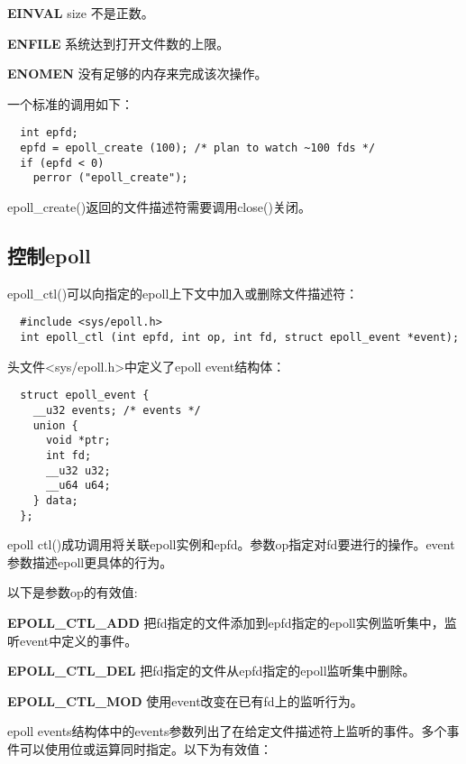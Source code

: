 \begin{eqlist*}
\item[\textbf{EINVAL}] size 不是正数。
\item[\textbf{ENFILE}] 系统达到打开文件数的上限。
\item[\textbf{ENOMEN}] 没有足够的内存来完成该次操作。
\end{eqlist*}

一个标准的调用如下：

\begin{lstlisting}
  int epfd;
  epfd = epoll_create (100); /* plan to watch ~100 fds */
  if (epfd < 0)
    perror ("epoll_create");
\end{lstlisting}

epoll\_create()返回的文件描述符需要调用close()关闭。

\subsection{控制epoll}

epoll\_ctl()可以向指定的epoll上下文中加入或删除文件描述符：

\begin{lstlisting}
  #include <sys/epoll.h>
  int epoll_ctl (int epfd, int op, int fd, struct epoll_event *event);
\end{lstlisting}

头文件<sys/epoll.h>中定义了epoll event结构体：

\begin{lstlisting}
  struct epoll_event {
    __u32 events; /* events */
    union {
      void *ptr;
      int fd;
      __u32 u32;
      __u64 u64;
    } data;
  };
\end{lstlisting}

epoll ctl()成功调用将关联epoll实例和epfd。参数op指定对fd要进行的操作。event参数描述epoll更具体的行为。

以下是参数op的有效值:

\begin{eqlist*}
\item[\textbf{EPOLL\_CTL\_ADD}] 把fd指定的文件添加到epfd指定的epoll实例监听集中，监听event中定义的事件。
\item[\textbf{EPOLL\_CTL\_DEL}] 把fd指定的文件从epfd指定的epoll监听集中删除。
\item[\textbf{EPOLL\_CTL\_MOD}] 使用event改变在已有fd上的监听行为。
\end{eqlist*}

epoll events结构体中的events参数列出了在给定文件描述符上监听的事件。多个事件可以使用位或运算同时指定。以下为有效值：


